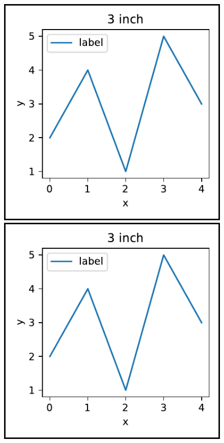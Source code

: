 \documentclass[a4paper, 12pt]{scrartcl}
\begin{document}
%






%
\begin{figure}[h]
   \centering
   \includegraphics{figur_3}
   \includegraphics{figur_3}

\end{figure}
\end{document}
